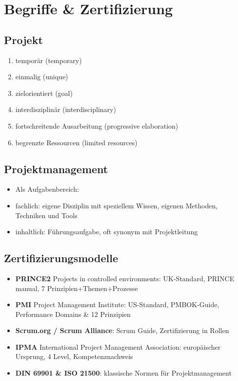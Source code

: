 \documentclass{article}
\author{Leopold Lemmermann}
\begin{document}
\createtitle
\section{Begriffe \& Zertifizierung}
\subsection{Projekt}
\begin{enumerate}
  \item temporär (temporary)
  \item einmalig (unique)
  \item zielorientiert (goal)
  \item interdisziplinär (interdisciplinary)
  \item fortschreitende Ausarbeitung (progressive elaboration)
  \item begrenzte Ressourcen (limited resources)
\end{enumerate}

\subsection{Projektmanagement}
\begin{itemize}
  \item Als Aufgabenbereich: 
  \item fachlich: eigene Disziplin mit speziellem Wissen, eigenen Methoden, Techniken und Tools
  \item inhaltlich: Führungsaufgabe, oft synonym mit Projektleitung
\end{itemize}

\subsection{Zertifizierungsmodelle}
\begin{itemize}
  \item \textbf{PRINCE2} Projects in controlled environments: UK-Standard, PRINCE manual, 7 Prinzipien+Themen+Prozesse
  \item \textbf{PMI} Project Management Institute: US-Standard, PMBOK-Guide, Performance Domains \& 12 Prinzipien
  \item \textbf{Scrum.org / Scrum Alliance}: Scrum Guide, Zertifizierung in Rollen
  \item \textbf{IPMA} International Project Management Association: europäischer Ursprung, 4 Level, Kompetenznachweis
  \item \textbf{DIN 69901 \& ISO 21500}: klassische Normen für Projektmanagement
\end{itemize}
\end{document}
